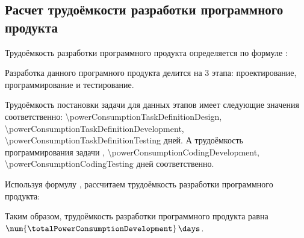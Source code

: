 \subsection{Расчет трудоёмкости разработки программного продукта}
\label{sec:economics:developmenteffort}

Трудоёмкость разработки программного продукта определяется по формуле :
\powerConsumptionDevelopmentEquation

Разработка данного програмного продукта делится на 3 этапа: проектирование, программирование и тестирование.

Трудоёмкость постановки задачи для данных этапов имеет следующие значения соответственно: \num{\powerConsumptionTaskDefinitionDesign}, \num{\powerConsumptionTaskDefinitionDevelopment}, \num{\powerConsumptionTaskDefinitionTesting} \! дней. А трудоёмкость программирования задачи \powerConsumptionCodingDesign, \num{\powerConsumptionCodingDevelopment}, \num{\powerConsumptionCodingTesting} \! дней соответственно.

Используя формулу , рассчитаем трудоёмкость разработки программного продукта:
\powerConsumptionDevelopmentFormulaApplied

Таким образом, трудоёмкость разработки программного продукта равна \(\num{\totalPowerConsumptionDevelopment} \, \days\).